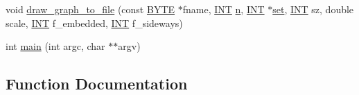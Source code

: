 \begin{DoxyCompactItemize}
\item 
void \mbox{\hyperlink{_a_p_p_s_2_c_o_m_b_i_n_a_t_o_r_i_c_s_2nauty_8_c_a7fdbfdd350aa2be773e04a496e2efe31}{draw\+\_\+graph\+\_\+to\+\_\+file}} (const \mbox{\hyperlink{galois_8h_ab6cc7b4aeb6ea31aba2b3fbfc83ff5e6}{B\+Y\+TE}} $\ast$fname, \mbox{\hyperlink{galois_8h_a09fddde158a3a20bd2dcadb609de11dc}{I\+NT}} \mbox{\hyperlink{simeon_8_c_a7f2cd26777ce0ff3fdaf8d02aacbddfb}{n}}, \mbox{\hyperlink{galois_8h_a09fddde158a3a20bd2dcadb609de11dc}{I\+NT}} $\ast$\mbox{\hyperlink{nauty_8h_a9690bea211101f22a5e154087590c3da}{set}}, \mbox{\hyperlink{galois_8h_a09fddde158a3a20bd2dcadb609de11dc}{I\+NT}} sz, double scale, \mbox{\hyperlink{galois_8h_a09fddde158a3a20bd2dcadb609de11dc}{I\+NT}} f\+\_\+embedded, \mbox{\hyperlink{galois_8h_a09fddde158a3a20bd2dcadb609de11dc}{I\+NT}} f\+\_\+sideways)
\item 
int \mbox{\hyperlink{_a_p_p_s_2_c_o_m_b_i_n_a_t_o_r_i_c_s_2nauty_8_c_a3c04138a5bfe5d72780bb7e82a18e627}{main}} (int argc, char $\ast$$\ast$argv)
\end{DoxyCompactItemize}


\subsection{Function Documentation}
\mbox{\label{_a_p_p_s_2_c_o_m_b_i_n_a_t_o_r_i_c_s_2nauty_8_c_a10dfaf42b6fbfd957f702a797af64457}} 
